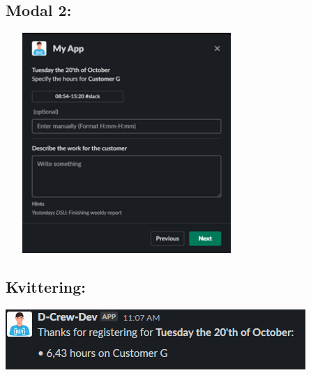 \documentclass[11pt]{report}
\begin{document}
\subsection*{Modal 2:}

\begin{center} 
\includegraphics[height=8.35cm, width=9.2cm]{modal2}
\end{center}

\subsection*{Kvittering:}

\begin{center} 
\includegraphics[height=2.28cm, width=11.38cm]{kvittering}
\end{center}
\end{document}
